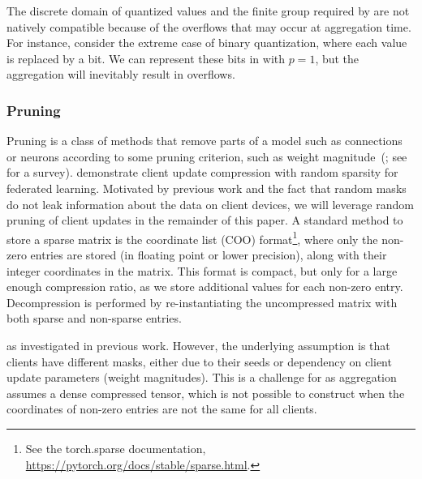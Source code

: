 The discrete domain of quantized values and the finite group required by \SecAgg are not natively compatible because of the overflows that may occur at aggregation time. For instance, consider the extreme case of binary quantization, where each value is replaced by a bit. 
We can represent these bits in \SecAgg with $p=1$, but the aggregation will inevitably result in overflows.

\subsubsection{Pruning}
\label{subsec:rp}

Pruning is a class of methods that remove parts of a model such as connections or neurons according to some pruning criterion, such as weight magnitude~(\cite{lecun1990optimal,hassabi1992second}; see \cite{Blalock20} for a survey). \cite{konen2016federated} demonstrate client update compression with random sparsity for federated learning. Motivated by previous work and the fact that random masks do not leak information about the data on client devices, we will leverage random pruning of client updates in the remainder of this paper. 
A standard method to store a sparse matrix is the coordinate list (COO) format\footnote{See the  {torch.sparse documentation}, \url{https://pytorch.org/docs/stable/sparse.html}.}, where only the non-zero entries are stored (in floating point or lower precision), along with their integer coordinates in the matrix. 
This format is compact, but only for a large enough compression ratio, as we store additional values for each non-zero entry.
Decompression is performed by re-instantiating the uncompressed matrix with both sparse and non-sparse entries.

 as investigated in previous work. However, the underlying assumption is that clients have different masks, either due to their seeds or dependency on client update parameters (\eg weight magnitudes). This is a challenge for \SecAgg as aggregation assumes a dense compressed tensor, which is not possible to construct when the coordinates of non-zero entries are not the same for all clients.

